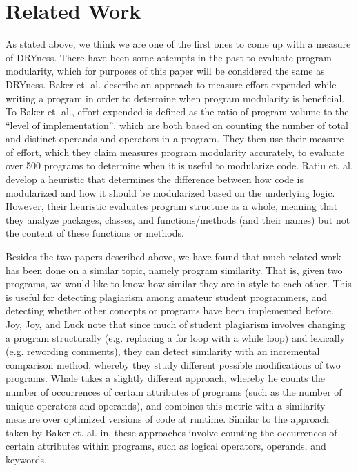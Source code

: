 \documentclass{article}
\begin{document}
\section{Related Work} As stated above, we think we are one of the first ones to come up with a measure of DRYness. There have been
some attempts in the past to evaluate program modularity, which for purposes of this paper will be considered the same as DRYness.
Baker et. al.\cite{Modularity1979} describe an approach to measure effort expended while writing a program in order
to determine when program modularity is beneficial. To Baker et. al., effort expended is defined as the ratio of program volume to 
the ``level of implementation'', which are both based on counting the number of total and distinct operands and operators in a program.
They then use their measure of effort, which they claim measures program modularity accurately, to evaluate over 500 programs to
determine when it is useful to modularize code. Ratiu et. al.\cite{LogicalModularity} develop a heuristic that determines the 
difference between how code is modularized and how it should be modularized based on the underlying logic. However, their heuristic
evaluates program structure as a whole, meaning that they analyze packages, classes, and functions/methods (and their names) but not the 
content of these functions or methods.

Besides the two papers described above, we have found that much related work has been done on a similar topic, namely
 program similarity. That is, given two programs, we would like to know how similar they are in style to each other.
This is useful for detecting plagiarism among amateur student programmers, and detecting whether other concepts or programs
have been implemented before. Joy, Joy, and Luck \cite{PlagiarismProgrammingAssignments} note that since much of student plagiarism involves changing a program structurally (e.g. replacing a for loop with a while loop) and lexically (e.g. rewording comments), they can
detect similarity with an incremental comparison method, whereby they study different possible modifications of two programs.
Whale \cite{ProgramSimilarityPopulations} takes a slightly different approach, whereby he counts the number of occurrences of certain attributes of programs (such as the number of unique operators and operands), and combines this metric with a similarity measure over optimized versions of code at runtime. Similar to the approach taken by Baker et. al. in\cite{Modularity1979}, these approaches involve counting the occurrences of certain attributes within programs, such as logical operators, operands, and keywords.
\end{document}
